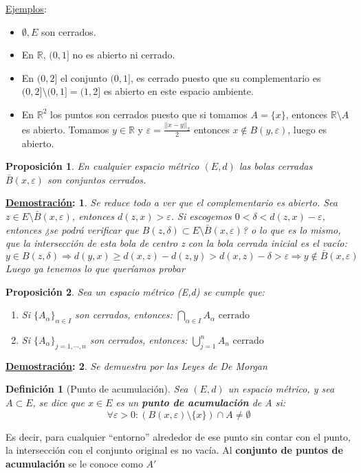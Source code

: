 \documentclass[10pt,a4paper,openright]{book}
\theoremstyle{break}
\newtheorem*{defi}{Definición}
\newtheorem*{prop}{Proposición}
\newtheorem*{demo}{\underline{Demostración}:}
\begin{document}
\underline{Ejemplos}:
\begin{itemize}
\item $\emptyset, E$ son cerrados.
\item En $\mathbb{R}$, $(0,1]$ no es abierto ni cerrado.
\item En $(0,2]$ el conjunto $(0,1]$, es cerrado puesto que su complementario es $(0,2]\setminus(0,1] = (1,2]$ es abierto en este espacio ambiente.
\item En $\mathbb{R}^{2}$ los puntos son cerrados puesto que si tomamos $A=\{x\}$, entonces $\mathbb{R}\setminus A$ es abierto. Tomamos $y\in \mathbb{R}$ y $\varepsilon = \frac{||x-y||_2}{2}$ entonces $x\notin B(y,\varepsilon)$, luego es abierto.
\end{itemize}

\begin{prop}
En cualquier espacio métrico $(E,d)$ las bolas cerradas $\bar{B}(x,\varepsilon)$ son conjuntos cerrados.
\end{prop}

\begin{demo}
Se reduce todo a ver que el complementario es abierto. Sea $z\in E\setminus \bar{B}(x,\varepsilon)$, entonces $d(z,x) > \varepsilon$.
Si escogemos $0 < \delta < d(z,x) - \varepsilon$,  entonces ¿se podrá verificar que $B(z,\delta)\subset E\setminus \bar{B}(x,\varepsilon)$? o lo que es lo mismo, que la intersección de esta bola de centro z con la bola cerrada inicial es el vacío:
$$y \in B(z,\delta)\Rightarrow d(y,x)\geq d(x,z) - d(z,y)> d(x,z) - \delta >\varepsilon \Rightarrow y \notin \bar{B}(x,\varepsilon)$$
Luego ya tenemos lo que queríamos probar
\end{demo}

\begin{prop}
Sea un espacio métrico (E,d) se cumple que:
\begin{enumerate}
\item Si $\{A_\alpha\}_{\alpha \in I}$ son cerrados, entonces: $\bigcap_{\alpha \in I} A_{\alpha} \mbox{ cerrado}$
\item Si $\{A_\alpha\}_{j = 1, \cdots, n}$ son cerrados, entonces: $\bigcup_{j = 1}^{n} A_{n} \mbox{ cerrado}$
\end{enumerate}
\end{prop}
\begin{demo}
Se demuestra por las Leyes de De Morgan
\end{demo}

\newpage

\begin{defi}[Punto de acumulación]
Sea $(E,d)$ un espacio métrico, y sea $A \subset E$, se dice que $x \in E$ es un \textbf{punto de acumulación} de A si:
$$\forall \varepsilon > 0: \left(B(x,\varepsilon)\setminus\{x\}\right)\cap A \neq \emptyset$$
\end{defi}
Es decir, para cualquier ``entorno'' alrededor de ese punto sin contar con el punto, la intersección con el conjunto original es no vacía. Al \textbf{conjunto de puntos de acumulación} se le conoce como $A'$
\end{document}

